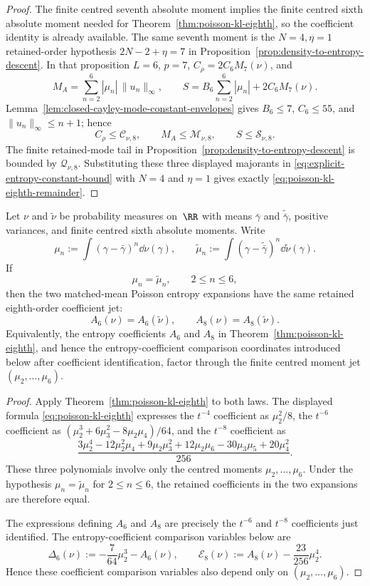 \begin{proof}
The finite centred seventh absolute moment implies the finite centred sixth
absolute moment needed for Theorem~\ref{thm:poisson-kl-eighth}, so the
coefficient identity is already available.  The same seventh moment is the
\(N=4,\eta=1\) retained-order hypothesis \(2N-2+\eta=7\) in
Proposition~\ref{prop:density-to-entropy-descent}.  In that proposition
\(L=6\), \(p=7\), \(C_\rho=2C_6M_7(\nu)\), and
\[
M_A=\sum_{n=2}^{6}|\mu_n|\,\|u_n\|_\infty,\qquad
S=B_6\sum_{n=2}^{6}|\mu_n|+2C_6M_7(\nu).
\]
Lemma~\ref{lem:closed-cayley-mode-constant-envelopes} gives
\(B_6\le7\), \(C_6\le55\), and \(\|u_n\|_\infty\le n+1\); hence
\[
C_\rho\le\mathcal C_{\nu,8},\qquad
M_A\le\mathcal M_{\nu,8},\qquad
S\le\mathcal S_{\nu,8}.
\]
The finite retained-mode tail in Proposition~\ref{prop:density-to-entropy-descent}
is bounded by \(\mathcal Q_{\nu,8}\).  Substituting these three displayed
majorants in \eqref{eq:explicit-entropy-constant-bound} with \(N=4\) and
\(\eta=1\) gives exactly
\eqref{eq:poisson-kl-eighth-remainder}.
\end{proof}

\begin{corollary}%
\label{cor:eighth-order-jet-factorization}
Let $\nu$ and $\widetilde\nu$ be probability measures on~$\RR$ with means
$\bar{\gamma}$ and $\widetilde{\bar{\gamma}}$, positive variances, and finite
centred sixth absolute moments.  Write
\[
\mu_n:=\int(\gamma-\bar{\gamma})^n\dd\nu(\gamma),
\qquad
\widetilde\mu_n:=\int(\gamma-\widetilde{\bar{\gamma}})^n
\dd\widetilde\nu(\gamma).
\]
If
\[
\mu_n=\widetilde\mu_n,
\qquad 2\le n\le6,
\]
then the two matched-mean Poisson entropy expansions have the same retained
eighth-order coefficient jet:
\[
A_6(\nu)=A_6(\widetilde\nu),
\qquad
A_8(\nu)=A_8(\widetilde\nu).
\]
Equivalently, the entropy coefficients \(A_6\) and
\(A_8\) in Theorem~\ref{thm:poisson-kl-eighth}, and hence the
entropy-coefficient comparison coordinates introduced below after coefficient identification,
factor through the finite centred moment jet $(\mu_2,\ldots,\mu_6)$.
\end{corollary}

\begin{proof}
Apply Theorem~\ref{thm:poisson-kl-eighth} to both laws.  The displayed
formula \eqref{eq:poisson-kl-eighth} expresses the $t^{-4}$ coefficient as
\(\mu_2^2/8\), the $t^{-6}$ coefficient as
\((\mu_2^3+6\mu_3^2-8\mu_2\mu_4)/64\), and the $t^{-8}$ coefficient as
\[
\frac{3\mu_2^4-12\mu_2^2\mu_4+9\mu_2\mu_3^2
+12\mu_2\mu_6-30\mu_3\mu_5+20\mu_4^2}{256}.
\]
These three polynomials involve only the centred moments
\(\mu_2,\ldots,\mu_6\).  Under the hypothesis
\(\mu_n=\widetilde\mu_n\) for $2\le n\le6$, the retained coefficients in the
two expansions are therefore equal.

The expressions defining \(A_6\) and
\(A_8\) are precisely the \(t^{-6}\) and \(t^{-8}\)
coefficients just identified.  The entropy-coefficient comparison variables below are
\[
\Delta_6(\nu)
:=-\frac{7}{64}\mu_2^3-A_6(\nu),
\qquad
\mathcal E_8(\nu)
:=A_8(\nu)-\frac{23}{256}\mu_2^4 .
\]
Hence these coefficient comparison variables also depend only on $(\mu_2,\ldots,\mu_6)$.
\end{proof}

